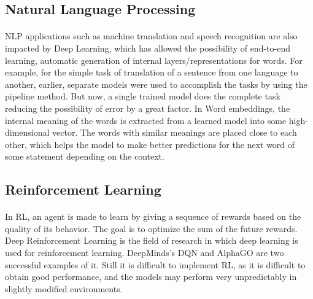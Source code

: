 \documentclass{article}
\begin{document}
              \subsection{Natural Language Processing}
                \paragraph{} NLP applications such as machine translation and speech recognition are also impacted by Deep Learning, which has allowed the possibility of end-to-end learning, automatic generation of internal layers/representations for words. For example, for the simple task of translation of a sentence from one language to another, earlier, separate models were used to accomplish the tasks by using the pipeline method. But now, a single trained model does the complete task reducing the possibility of error by a great factor. In Word embeddings, the internal meaning of the words is extracted from a learned model into some high-dimensional vector. The words with similar meanings are placed close to each other, which helps the model to make better predictions for the next word of some statement depending on the context.
              \subsection{Reinforcement Learning}
                \paragraph{} In RL, an agent is made to learn by giving a sequence of rewards based on the quality of its behavior. The goal is to optimize the sum of the future rewards. Deep Reinforcement Learning is the field of research in which deep learning is used for reinforcement learning. DeepMinds’s DQN and AlphaGO are two successful examples of it. Still it is difficult to implement RL, as it is difficult to obtain good performance, and the models may perform very unpredictably in slightly modified environments.  

      



      
   
\end{document}

